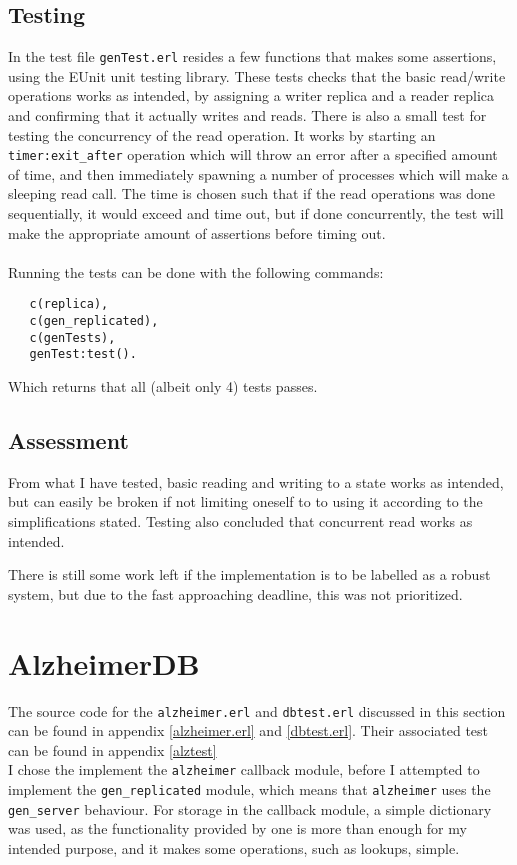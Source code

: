 \documentclass[a4paper]{article}
\begin{document}
\subsection{Testing}
\label{sub:Testing_rep}
In the test file \texttt{genTest.erl} resides a few functions that makes some assertions, using the EUnit unit testing library. These tests checks that the basic read/write operations works as intended, by assigning a writer replica and a reader replica and confirming that it actually writes and reads. There is also a small test for testing the concurrency of the read operation. It works by starting an \texttt{timer:exit\_after} operation which will throw an error after a specified amount of
time, and then immediately spawning a number of processes which will make a sleeping read call. The time is chosen such that if the read operations was done sequentially, it would exceed and time out, but if done concurrently, the test will make the appropriate amount of assertions before timing out.\\
\\
Running the tests can be done with the following commands:
\begin{verbatim}
   c(replica),
   c(gen_replicated),
   c(genTests),
   genTest:test().
\end{verbatim}
Which returns that all (albeit only 4) tests passes.
\subsection{Assessment}
\label{sub:Assessment_rep}
From what I have tested, basic reading and writing to a state works as intended, but can easily be broken if not limiting oneself to to using it according to the simplifications stated. Testing also concluded that concurrent read works as intended.

There is still some work left if the implementation is to be labelled as a robust system, but due to the fast approaching deadline, this was not prioritized.
\section{AlzheimerDB}
The source code for the \texttt{alzheimer.erl} and \texttt{dbtest.erl} discussed in this section can be found in appendix \ref{alzheimer.erl} and \ref{dbtest.erl}. Their associated test can be found in appendix \ref{alztest}\\

I chose the implement the \texttt{alzheimer} callback module, before I attempted to implement the \texttt{gen\_replicated} module, which means that \texttt{alzheimer} uses the \texttt{gen\_server} behaviour. For storage in the callback module, a simple dictionary was used, as the functionality provided by one is more than enough for my intended purpose, and it makes some operations, such as lookups, simple.
\end{document}
